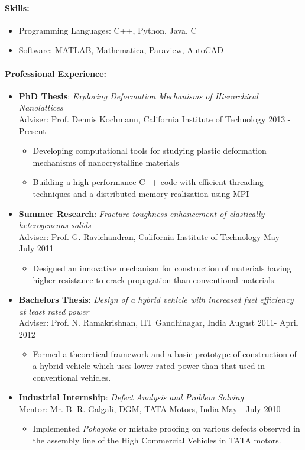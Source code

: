 \documentclass[10pt,fleqn]{article}
\begin{document}
\paragraph*{Skills:}
\begin{itemize}
\setlength{\itemsep}{0pt}
\setlength{\parskip}{0pt}
\item Programming Languages: C++, Python, Java, C
\item Software: MATLAB, Mathematica, Paraview, AutoCAD
\end{itemize}
\paragraph*{Professional Experience:}
\begin{itemize}
\setlength{\itemsep}{8pt}
\setlength{\parskip}{0pt}
\item[] \textbf{PhD Thesis}: \emph{Exploring Deformation Mechanisms of Hierarchical Nanolattices} \\
		 Adviser: Prof. Dennis Kochmann, California Institute of Technology \hfill 2013 - Present 
		  \begin{itemize}
		  \item Developing computational tools for studying plastic deformation mechanisms of nanocrystalline materials
		  \item Building a high-performance C++ code with efficient threading techniques and a distributed memory realization using MPI
 		  \end{itemize}
\item[] \textbf{Summer Research}: \emph{Fracture toughness enhancement of elastically heterogeneous solids} \\
		  Adviser: Prof. G. Ravichandran, California Institute of Technology \hfill May - July 2011
		   \begin{itemize}
			\item Designed an innovative mechanism for construction of materials having higher resistance to crack propagation than conventional materials.
 			\end{itemize}
\item[] \textbf{Bachelors Thesis}: \emph{Design of a hybrid vehicle with increased fuel efficiency at least rated power}\\		
		  Adviser: Prof. N. Ramakrishnan, IIT Gandhinagar, India \hfill August 2011- April 2012
		   \begin{itemize}
			\item Formed a theoretical framework and a basic prototype of construction of a hybrid vehicle which uses lower rated power than that used in conventional vehicles.
 			\end{itemize} 
\item[] \textbf{Industrial Internship}: \emph{Defect Analysis and Problem Solving} \\
		 Mentor: Mr. B. R. Galgali, DGM, TATA Motors, India \hfill May - July 2010
		    \begin{itemize}
			\item Implemented \emph{Pokayoke} or mistake proofing on various defects observed in the assembly line of the High Commercial Vehicles in TATA motors.
 			\end{itemize} 			
\end{itemize}
\end{document}
